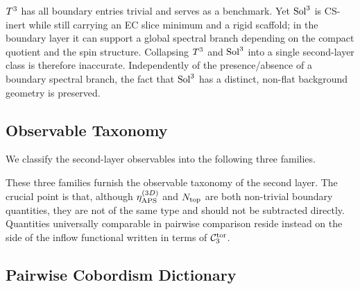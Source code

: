 $T^3$ has all boundary entries trivial and serves as a benchmark.  Yet
$\mathrm{Sol}^3$ is CS-inert while still carrying an EC slice minimum and a rigid
scaffold; in the boundary layer it can support a global spectral branch
depending on the compact quotient and the spin structure.  Collapsing
$T^3$ and $\mathrm{Sol}^3$ into a single second-layer class is therefore
inaccurate.  Independently of the presence/absence of a boundary spectral
branch, the fact that $\mathrm{Sol}^3$ has a distinct, non-flat background
geometry is preserved.

\subsection{Observable Taxonomy}
\label{sec:boundary:taxonomy}

We classify the second-layer observables into the following three families.

\begin{table}[H]
\centering
{}
\caption{Three observable families of the second layer.}
\label{tab:taxonomy}
\end{table}

These three families furnish the observable taxonomy of the second layer.
The crucial point is that, although $\eta_{\mathrm{APS}}^{(3D)}$ and $N_{\mathrm{top}}$ are both
non-trivial boundary quantities, they are not of the same type and should
not be subtracted directly.  Quantities universally comparable in pairwise
comparison reside instead on the side of the inflow functional written in
terms of $\mathcal{C}_3^{\mathrm{tor}}$.

\subsection{Pairwise Cobordism Dictionary}
\label{sec:boundary:pairwise}

